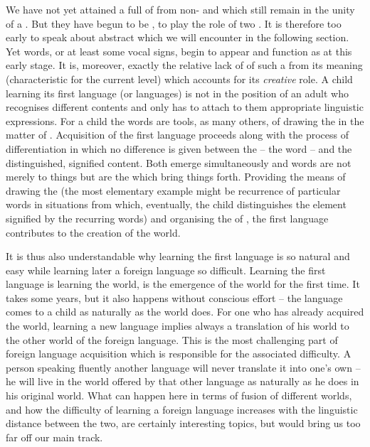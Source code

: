 \pa\label{pa:languageA} We have not yet attained a full  of
 from non- and  which still remain
in the unity of a  \nexus. But they have begun to be
, to play the role of two . It is
therefore too early to speak about abstract  which we will encounter
in the following section. Yet words, or at least some vocal signs, begin to
appear and function as  at this early stage. It is, moreover, exactly
the relative lack of  of such a  from its meaning
(characteristic for the current level) which accounts for its {\em creative}
role. A child learning its first language (or languages) is not in the position
of an adult who recognises different contents and only has to attach to them
appropriate linguistic expressions. For a child the words are tools, as many
others, of drawing the  in the matter of .
Acquisition of the first language proceeds along with the process of
differentiation in which no difference is given between the 
 -- the word -- and the distinguished, signified content. Both emerge
simultaneously and words are not merely  to things but are the
 which bring things forth.  Providing the means of drawing the
 (the most elementary example might be recurrence of particular
words in situations from which, eventually, the child distinguishes the element
signified by the recurring words) and organising the  of
, the first language contributes to the creation of the world.

It is thus also understandable why learning the first language is so natural and
easy while learning later a foreign language so difficult.  Learning the first
language is learning the world, is the emergence of the world for the first
time. It takes some years, but it also happens without conscious effort -- the
language comes to a child as naturally as the world does.  For one who has
already acquired the world, learning a new language implies always a 
translation of his world to the other world of the foreign language. This is the
most challenging part of foreign language acquisition which is responsible for
the associated difficulty. A person speaking fluently another language will
never translate it into one's own -- he will live in the world offered by that
other language as naturally as he does in his original world. What can happen
here in terms of fusion of different worlds, and how the difficulty of learning
a foreign language increases with the linguistic distance between the two, are
certainly interesting topics, but would bring us too far off our main track.

